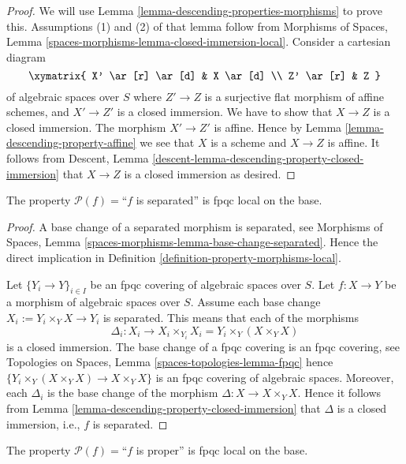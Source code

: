\begin{proof}
We will use
Lemma \ref{lemma-descending-properties-morphisms}
to prove this. Assumptions (1) and (2) of that lemma follow from
Morphisms of Spaces,
Lemma \ref{spaces-morphisms-lemma-closed-immersion-local}.
Consider a cartesian diagram
$$
\xymatrix{
X' \ar[r] \ar[d] & X \ar[d] \\
Z' \ar[r] & Z
}
$$
of algebraic spaces over $S$
where $Z' \to Z$ is a surjective flat morphism of affine schemes,
and $X' \to Z'$ is a closed immersion. We have to show that $X \to Z$
is a closed immersion. The morphism $X' \to Z'$ is affine. Hence by
Lemma \ref{lemma-descending-property-affine}
we see that $X$ is a scheme and $X \to Z$ is affine.
It follows from
Descent, Lemma \ref{descent-lemma-descending-property-closed-immersion}
that $X \to Z$ is a closed immersion as desired.
\end{proof}

\begin{lemma}
\label{lemma-descending-property-separated}
The property $\mathcal{P}(f) =$``$f$ is separated''
is fpqc local on the base.
\end{lemma}

\begin{proof}
A base change of a separated morphism is separated, see
Morphisms of Spaces,
Lemma \ref{spaces-morphisms-lemma-base-change-separated}.
Hence the direct implication in
Definition \ref{definition-property-morphisms-local}.

\medskip\noindent
Let $\{Y_i \to Y\}_{i \in I}$ be an fpqc covering of algebraic spaces over $S$.
Let $f : X \to Y$ be a morphism of algebraic spaces over $S$.
Assume each base change $X_i := Y_i \times_Y X \to Y_i$ is separated.
This means that each of the morphisms
$$
\Delta_i :
X_i
\longrightarrow
X_i \times_{Y_i} X_i = Y_i \times_Y (X \times_Y X)
$$
is a closed immersion. The base change of a fpqc covering is an
fpqc covering, see
Topologies on Spaces, Lemma \ref{spaces-topologies-lemma-fpqc}
hence $\{Y_i \times_Y (X \times_Y X) \to X \times_Y X\}$
is an fpqc covering of algebraic spaces. Moreover, each
$\Delta_i$ is the base change of the morphism
$\Delta : X \to X \times_Y X$. Hence it follows from
Lemma \ref{lemma-descending-property-closed-immersion}
that $\Delta$ is a closed immersion, i.e., $f$ is separated.
\end{proof}

\begin{lemma}
\label{lemma-descending-property-proper}
The property $\mathcal{P}(f) =$``$f$ is proper''
is fpqc local on the base.
\end{lemma}

